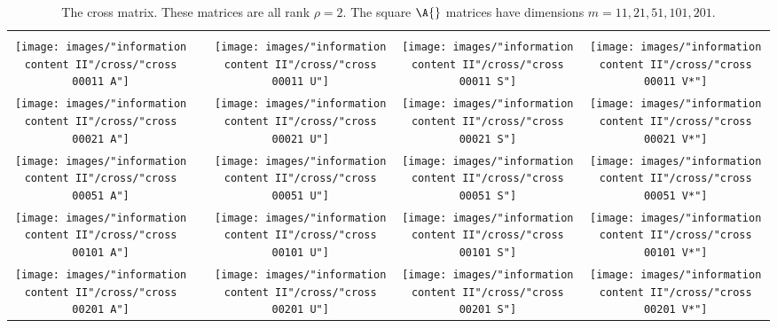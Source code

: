 \begin{table}[htdp]
\caption[The cross matrix]{The cross matrix. These matrices are all rank $\rho = 2$. The square $\A{}$ matrices have dimensions $m=11,21,51,101,201$.}
\begin{center}
\begin{tabular}{ccccc}
%
 \svdi{} \\
%
 \texttt{[image: images/"information content II"/cross/"cross 00011 A"]} &&
 \texttt{[image: images/"information content II"/cross/"cross 00011 U"]} &
 \texttt{[image: images/"information content II"/cross/"cross 00011 S"]} &
 \texttt{[image: images/"information content II"/cross/"cross 00011 V*"]} \\[10pt]
%
 \texttt{[image: images/"information content II"/cross/"cross 00021 A"]} &&
 \texttt{[image: images/"information content II"/cross/"cross 00021 U"]} &
 \texttt{[image: images/"information content II"/cross/"cross 00021 S"]} &
 \texttt{[image: images/"information content II"/cross/"cross 00021 V*"]} \\[10pt]
%
 \texttt{[image: images/"information content II"/cross/"cross 00051 A"]} &&
 \texttt{[image: images/"information content II"/cross/"cross 00051 U"]} &
 \texttt{[image: images/"information content II"/cross/"cross 00051 S"]} &
 \texttt{[image: images/"information content II"/cross/"cross 00051 V*"]} \\[10pt]
%
 \texttt{[image: images/"information content II"/cross/"cross 00101 A"]} &&
 \texttt{[image: images/"information content II"/cross/"cross 00101 U"]} &
 \texttt{[image: images/"information content II"/cross/"cross 00101 S"]} &
 \texttt{[image: images/"information content II"/cross/"cross 00101 V*"]} \\[10pt]
%
 \texttt{[image: images/"information content II"/cross/"cross 00201 A"]} &&
 \texttt{[image: images/"information content II"/cross/"cross 00201 U"]} &
 \texttt{[image: images/"information content II"/cross/"cross 00201 S"]} &
 \texttt{[image: images/"information content II"/cross/"cross 00201 V*"]} \\
%
%
\end{tabular}
\end{center}
\label{tab:info content II:random}
\end{table}%


\endinput